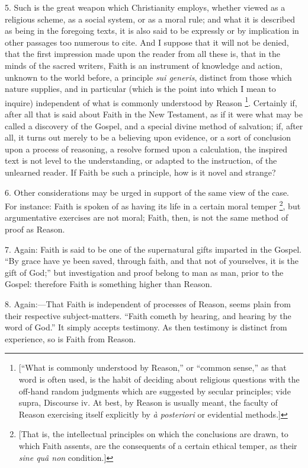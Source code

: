 5. Such is the great weapon which Christianity employs, whether
viewed as a religious scheme, as a social system, or as a moral rule;
and what it is described as being in the foregoing texts, it is also
said to be expressly or by implication in other passages too numerous
to cite. And I suppose that it will not be denied, that the first
impression made upon the reader from all these is, that in the minds
of the sacred writers, Faith is an instrument of knowledge and action,
unknown to the world before, a principle \emph{sui generis}, distinct
from those which nature supplies, and in particular (which is the
point into which I mean to inquire) independent of what is commonly
understood by Reason \footnote{[``What is
commonly understood by Reason,'' or ``common sense,'' as
that word is often used, is the habit of deciding about religious
questions with the off-hand random judgments which are suggested by
secular principles; vide supra, Discourse iv. At best, by Reason is
usually meant, the faculty of Reason exercising itself explicitly by \emph{à
posteriori} or evidential methods.]}.
Certainly if, after all that is said about Faith in the New Testament,
as if it were what may be called a discovery of the Gospel, and a
special divine method of salvation; if, after all, it turns out merely
to be a believing upon evidence, or a sort of conclusion upon a
process of reasoning, a resolve formed upon a calculation, the
inspired text is not level to the understanding, or adapted to the
instruction, of the unlearned reader. If Faith be such a principle,
how is it novel and strange?

6. Other considerations may be urged in support of the same view of
the case. For instance: Faith is spoken of as having its life in a
certain moral temper \footnote{[That is, the
intellectual principles on which the conclusions are drawn, to which
Faith assents, are the consequents of a certain ethical temper, as
their \emph{sine quâ non} condition.]},
but
argumentative exercises are not moral; Faith, then, is not the same
method of proof as Reason.

7. Again: Faith is said to be one of the supernatural gifts
imparted in the Gospel. ``By grace have ye been saved, through
faith, and that not of yourselves, it is the gift of God;'' but
investigation and proof belong to man as man, prior to the Gospel:
therefore Faith is something higher than Reason.

8. Again:—That Faith is independent of processes of Reason, seems
plain from their respective subject-matters. ``Faith cometh by
hearing, and hearing by the word of God.'' It simply accepts
testimony. As then testimony is distinct from experience, so is Faith
from Reason.

